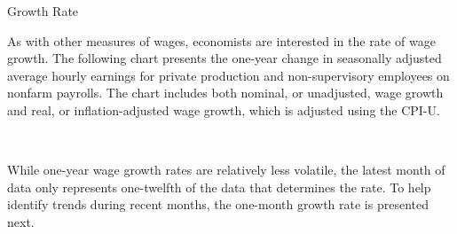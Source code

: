 \begin{minipage}{0.76\textwidth} 
\normalsize{Growth Rate}
\vspace*{-1mm}

\small As with other measures of wages, economists are interested in the rate of wage growth. The following chart presents the one-year change in seasonally adjusted average hourly earnings for private production and non-supervisory employees on nonfarm payrolls. The chart includes both nominal, or unadjusted, wage growth and real, or inflation-adjusted wage growth, which is adjusted using the CPI-U.




\vspace{1mm}

\\
\vspace{2mm}

\small While one-year wage growth rates are relatively less volatile, the latest month of data only represents one-twelfth of the data that determines the rate. To help identify trends during recent months, the one-month growth rate is presented next. 
\end{minipage}
\newpage
\hypertarget{ahelt}{}

